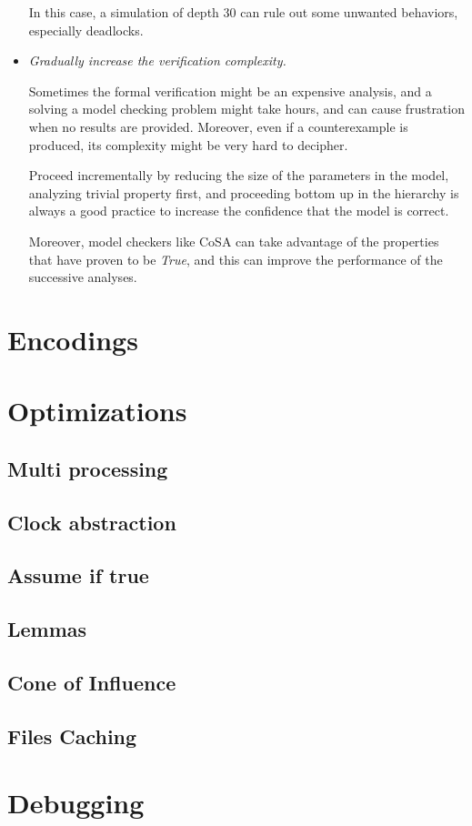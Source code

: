 \documentclass{article}
\theoremstyle{definition}
\begin{document}
\begin{itemize}
  In this case, a simulation of depth $30$ can rule out some unwanted
  behaviors, especially deadlocks.

  
\item \textit{Gradually increase the verification complexity.}

  Sometimes the formal verification might be an expensive analysis,
  and a solving a model checking problem might take hours, and can
  cause frustration when no results are provided. Moreover, even if a
  counterexample is produced, its complexity might be very hard to
  decipher.

  Proceed incrementally by reducing the size of the parameters in the
  model, analyzing trivial property first, and proceeding bottom up in
  the hierarchy is always a good practice to increase the confidence
  that the model is correct.

  Moreover, model checkers like CoSA can take advantage of the
  properties that have proven to be \emph{True}, and this can improve
  the performance of the successive analyses.
\end{itemize}
  


\section{Encodings}
\label{sec:encodings}



\section{Optimizations}
\label{sec:optimizations}

\subsection{Multi processing}

\subsection{Clock abstraction}

\subsection{Assume if true}

\subsection{Lemmas}

\subsection{Cone of Influence}

\subsection{Files Caching}


\section{Debugging}
\label{sec:debugging}

\newpage


\end{document}
